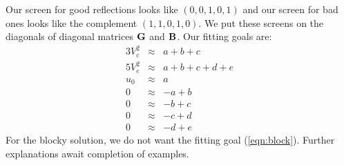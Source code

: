 \par
Our screen for good reflections looks like $(0,0,1,0,1)$
and our screen for bad ones looks like the complement $(1,1,0,1,0)$.
We put these screens on the diagonals of diagonal matrices
$\bold G$ and $\bold B$.
Our fitting goals are:
\begin{eqnarray}
3V_c^2 &\approx& a+b+c
\\
5V_e^2 &\approx& a+b+c+d+e
\\
u_0 &\approx& a
\\
0 &\approx& -a+b
\\
0 &\approx& -b+c
\\
0 &\approx& -c+d
\label{eqn:block}
\\
0 &\approx& -d+e
\end{eqnarray}
For the blocky solution, we do not want the fitting goal (\ref{eqn:block}).
Further explanations await completion of examples.

